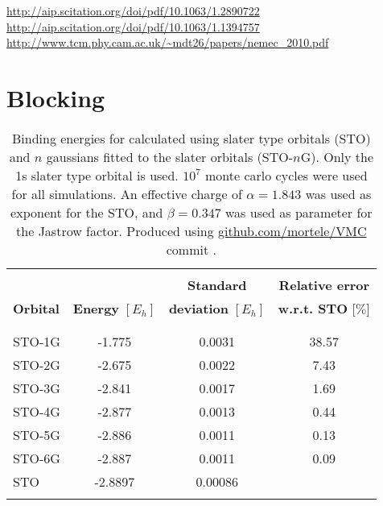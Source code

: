 \documentclass[../../master.tex]{subfiles}
\begin{document}
\url{http://aip.scitation.org/doi/pdf/10.1063/1.2890722}
\url{http://aip.scitation.org/doi/pdf/10.1063/1.1394757}
\url{http://www.tcm.phy.cam.ac.uk/~mdt26/papers/nemec_2010.pdf}




\section{Blocking}


\begin{table}
\centering{}
\setlength\extrarowheight{2pt}
\begin{tabularx}{\textwidth}{X *{3}{S[table-format=-1.3,table-space-text-post=***]}}
\hline
\hline
\\[-0.9em]
                 &                          & \phantom{-}\textbf{Standard}          & \textbf{Relative error}    \\
\textbf{Orbital} & \textbf{Energy} $[E_h]$  & \textbf{deviation} $[E_h]$ & \textbf{w.r.t. STO} [$\%$]  \\
\\[-0.9em]
\hline
\\[-0.9em]
STO-1G & -1.775  & 0.0031  &  38.57 \\
STO-2G & -2.675  & 0.0022  &   7.43 \\
STO-3G & -2.841  & 0.0017  &   1.69 \\
STO-4G & -2.877  & 0.0013  &   0.44 \\
STO-5G & -2.886  & 0.0011  &   0.13 \\
STO-6G & -2.887  & 0.0011  &   0.09 \\
STO    & -2.8897 & 0.00086 & \\
\\[-0.9em]
\hline
\end{tabularx}
\caption{Binding energies for  calculated using slater type orbitals (STO) and $n$ gaussians fitted to the slater orbitals (STO-$n$G). Only the 1s slater type orbital is used. $10^7$ monte carlo cycles were used for all simulations. An effective charge of $\alpha=1.843$ was used as exponent for the STO, and $\beta=0.347$ was used as parameter for the Jastrow factor. Produced using \url{github.com/mortele/VMC} commit . \label{tab:vmcv1}}
\end{table}
\end{document}
